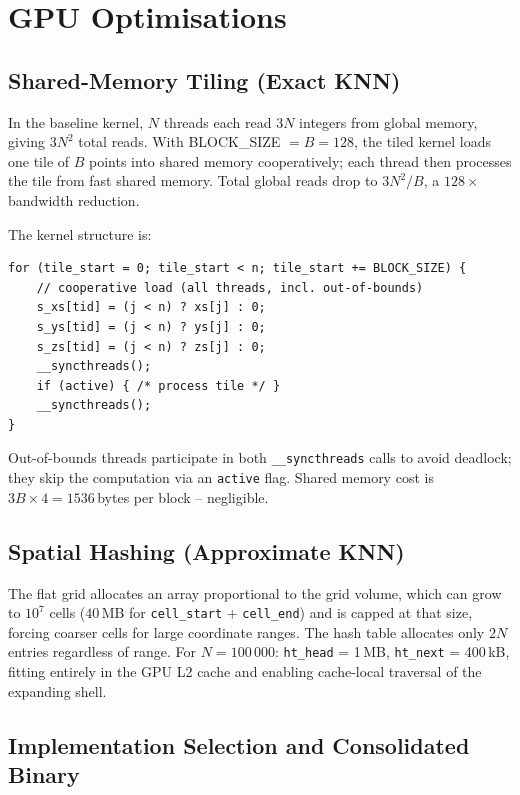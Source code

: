\documentclass[11pt,a4paper]{article}
\begin{document}
\section{GPU Optimisations}

\subsection{Shared-Memory Tiling (Exact KNN)}

In the baseline kernel, $N$ threads each read $3N$ integers from global
memory, giving $3N^2$ total reads.  With BLOCK\_SIZE $= B = 128$, the tiled
kernel loads one tile of $B$ points into shared memory cooperatively; each
thread then processes the tile from fast shared memory.  Total global reads
drop to $3N^2/B$, a $128\times$ bandwidth reduction.

The kernel structure is:
\begin{lstlisting}
for (tile_start = 0; tile_start < n; tile_start += BLOCK_SIZE) {
    // cooperative load (all threads, incl. out-of-bounds)
    s_xs[tid] = (j < n) ? xs[j] : 0;
    s_ys[tid] = (j < n) ? ys[j] : 0;
    s_zs[tid] = (j < n) ? zs[j] : 0;
    __syncthreads();
    if (active) { /* process tile */ }
    __syncthreads();
}
\end{lstlisting}
Out-of-bounds threads participate in both \texttt{\_\_syncthreads} calls to
avoid deadlock; they skip the computation via an \texttt{active} flag.  Shared
memory cost is $3B\times 4 = 1536$\,bytes per block -- negligible.

\subsection{Spatial Hashing (Approximate KNN)}

The flat grid allocates an array proportional to the grid volume, which can
grow to $10^7$ cells ($40$\,MB for \texttt{cell\_start} + \texttt{cell\_end})
and is capped at that size, forcing coarser cells for large coordinate ranges.
The hash table allocates only $2N$ entries regardless of range.  For
$N=100\,000$: \texttt{ht\_head} = 1\,MB, \texttt{ht\_next} = 400\,kB, fitting
entirely in the GPU L2 cache and enabling cache-local traversal of the
expanding shell.

\subsection{Implementation Selection and Consolidated Binary}
\end{document}
